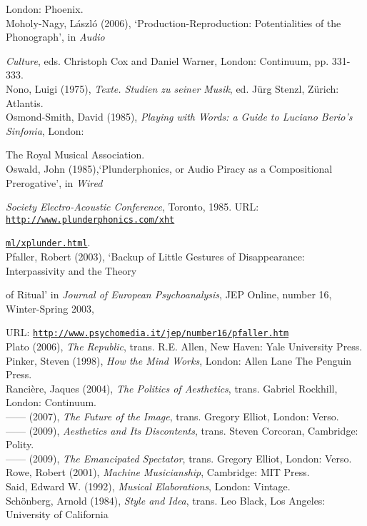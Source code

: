 London: Phoenix. 
\hypertarget{moholy}{}\\
Moholy-Nagy, L\'{a}szl\'{o} (2006),  `Production-Reproduction: Potentialities of the Phonograph', in \emph{Audio} 

\emph{Culture}, eds. Christoph Cox and Daniel Warner, London: Continuum, pp. 331-333.
\hypertarget{nono}{}\\
Nono, Luigi (1975), \emph{Texte. Studien zu seiner Musik}, ed. J\"{u}rg Stenzl, Z\"{u}rich: Atlantis. 
\hypertarget{ossmith}{}\\
Osmond-Smith, David (1985), \emph{Playing with Words: a Guide to Luciano Berio's Sinfonia},  London: 

The Royal Musical Association. 
\hypertarget{oswald}{}\\
Oswald, John (1985),`Plunderphonics, or Audio Piracy as a Compositional Prerogative', in \emph{Wired}

\emph{Society Electro-Acoustic Conference}, Toronto, 1985. URL: \href{http://www.plunderphonics.com/xhtml/xplunder.html}{\texttt{http://www.plunderphonics.com/xht}}

\href{http://www.plunderphonics.com/xhtml/xplunder.html}{\texttt{ml/xplunder.html}}.
\hypertarget{pfaller}{}\\
Pfaller, Robert (2003), `Backup of Little Gestures of Disappearance: Interpassivity and the Theory 

of Ritual' in \emph{Journal of European Psychoanalysis}, JEP Online, number 16, Winter-Spring 2003, 

URL: \href{http://www.psychomedia.it/jep/number16/pfaller.htm}{\texttt {http://www.psychomedia.it/jep/number16/pfaller.htm}} 
\hypertarget{plato}{}\\
Plato (2006), \emph{The Republic}, trans. R.E. Allen, New Haven: Yale University Press. 
\hypertarget{pinker}{}\\
Pinker, Steven (1998), \emph{How the Mind Works}, London: Allen Lane The Penguin Press. 
\hypertarget{ranpoli}{}\\
Ranci\`{e}re, Jaques (2004), \emph{The Politics of Aesthetics}, trans. Gabriel Rockhill, London: Continuum. 
\hypertarget{ranimg}{}\\
------ (2007), \emph{The Future of the Image}, trans. Gregory Elliot, London: Verso. 
\hypertarget{ranaesth}{}\\
------ (2009), \emph{Aesthetics and Its Discontents}, trans. Steven Corcoran, Cambridge: Polity. 
\hypertarget{ranspec}{}\\
------ (2009), \emph{The Emancipated Spectator}, trans. Gregory Elliot, London: Verso.
\hypertarget{rowe}{}\\
Rowe, Robert (2001), \emph{Machine Musicianship}, Cambridge: MIT Press. 
\hypertarget{said}{}\\
Said, Edward W. (1992), \emph{Musical Elaborations}, London: Vintage. 
\hypertarget{schoen}{}\\
Sch\"{o}nberg, Arnold (1984),  \emph{Style and Idea}, trans. Leo Black, Los Angeles: University of California

